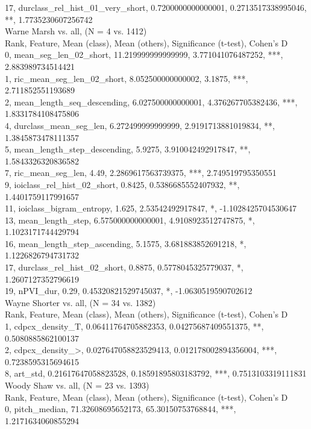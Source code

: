 17, durclass_rel_hist_01_very_short, 0.7200000000000001, 0.2713517338995046, **, 1.7735230607256742\\
Warne Marsh vs. all, (N = 4 vs. 1412)\\
Rank, Feature, Mean (class), Mean (others), Significance (t-test), Cohen's D\\
0, mean_seg_len_02_short, 11.219999999999999, 3.771041076487252, ***, 2.883989734514421\\
1, ric_mean_seg_len_02_short, 8.052500000000002, 3.1875, ***, 2.711852551193689\\
2, mean_length_seq_descending, 6.027500000000001, 4.376267705382436, ***, 1.8331784108475806\\
4, durclass_mean_seg_len, 6.272499999999999, 2.9191713881019834, **, 1.3845873478111357\\
5, mean_length_step_descending, 5.9275, 3.910042492917847, **, 1.5843326320836582\\
7, ric_mean_seg_len, 4.49, 2.2869617563739375, ***, 2.749519795350551\\
9, ioiclass_rel_hist_02_short, 0.8425, 0.5386685552407932, **, 1.4401759117991657\\
11, ioiclass_bigram_entropy, 1.625, 2.53542492917847, *, -1.1028425704530647\\
13, mean_length_step, 6.575000000000001, 4.9108923512747875, *, 1.1023171744429794\\
16, mean_length_step_ascending, 5.1575, 3.681883852691218, *, 1.1226826794731732\\
17, durclass_rel_hist_02_short, 0.8875, 0.5778045325779037, *, 1.2607127352796619\\
19, nPVI_dur, 0.29, 0.45320821529745037, *, -1.0630519590702612\\
Wayne Shorter vs. all, (N = 34 vs. 1382)\\
Rank, Feature, Mean (class), Mean (others), Significance (t-test), Cohen's D\\
1, cdpcx_density_T, 0.06411764705882353, 0.04275687409551375, **, 0.5080885862100137\\
2, cdpcx_density_>, 0.027647058823529413, 0.012178002894356004, ***, 0.7238595315694615\\
8, art_std, 0.21617647058823528, 0.18591895803183792, ***, 0.7513103319111831\\
Woody Shaw vs. all, (N = 23 vs. 1393)\\
Rank, Feature, Mean (class), Mean (others), Significance (t-test), Cohen's D\\
0, pitch_median, 71.32608695652173, 65.30150753768844, ***, 1.2171634060855294\\
